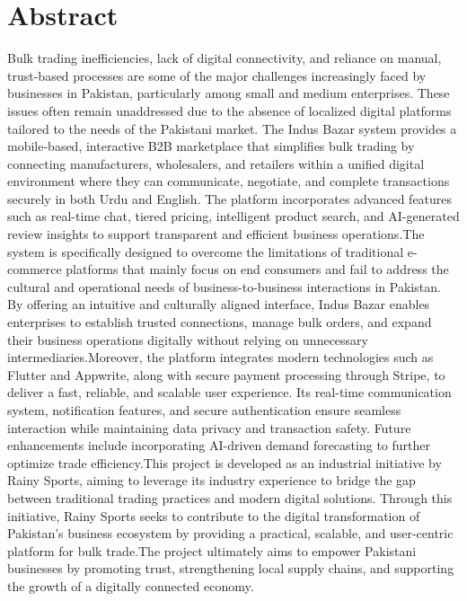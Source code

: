 \chapter*{Abstract}

Bulk trading inefficiencies, lack of digital connectivity, and reliance on manual, trust-based processes are some of the major challenges increasingly faced by businesses in Pakistan, particularly among small and medium enterprises. These issues often remain unaddressed due to the absence of localized digital platforms tailored to the needs of the Pakistani market. The Indus Bazar system provides a mobile-based, interactive B2B marketplace that simplifies bulk trading by connecting manufacturers, wholesalers, and retailers within a unified digital environment where they can communicate, negotiate, and complete transactions securely in both Urdu and English. The platform incorporates advanced features such as real-time chat, tiered pricing, intelligent product search, and AI-generated review insights to support transparent and efficient business operations.The system is specifically designed to overcome the limitations of traditional e-commerce platforms that mainly focus on end consumers and fail to address the cultural and operational needs of business-to-business interactions in Pakistan. By offering an intuitive and culturally aligned interface, Indus Bazar enables enterprises to establish trusted connections, manage bulk orders, and expand their business operations digitally without relying on unnecessary intermediaries.Moreover, the platform integrates modern technologies such as Flutter and Appwrite, along with secure payment processing through Stripe, to deliver a fast, reliable, and scalable user experience. Its real-time communication system, notification features, and secure authentication ensure seamless interaction while maintaining data privacy and transaction safety. Future enhancements include incorporating AI-driven demand forecasting to further optimize trade efficiency.This project is developed as an industrial initiative by Rainy Sports, aiming to leverage its industry experience to bridge the gap between traditional trading practices and modern digital solutions. Through this initiative, Rainy Sports seeks to contribute to the digital transformation of Pakistan’s business ecosystem by providing a practical, scalable, and user-centric platform for bulk trade.The project ultimately aims to empower Pakistani businesses by promoting trust, strengthening local supply chains, and supporting the growth of a digitally connected economy.
